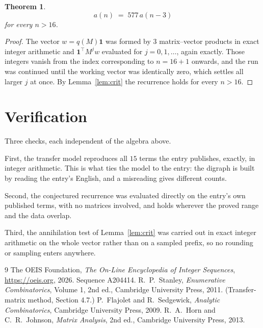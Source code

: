 \documentclass[11pt,a4paper]{article}
\theoremstyle{plain}
\newtheorem{theorem}{Theorem}
\theoremstyle{definition}
\begin{document}
\begin{theorem}
\[
a(n)\;=\;577\,a(n-3)
\]
for every $n>16$.
\end{theorem}

\begin{proof}
The vector $w=q(M)\mathbf{1}$ was formed by $3$ matrix--vector products in exact
integer arithmetic and $\mathbf{1}^{\!\top}M^{j}w$ evaluated for $j=0,1,\dots$, again
exactly. Those integers vanish from the index corresponding to $n=16+1$ onwards, and the
run was continued until the working vector was identically zero, which settles all larger $j$
at once. By Lemma~\ref{lem:crit} the recurrence holds for every $n>16$.
\end{proof}

\section{Verification}

Three checks, each independent of the algebra above.

First, the transfer model reproduces all $15$ terms the entry publishes, exactly, in
integer arithmetic. This is what ties the model to the entry: the digraph is built by reading
the entry's English, and a misreading gives different counts.

Second, the conjectured recurrence was evaluated directly on the entry's own published terms,
with no matrices involved, and holds wherever the proved range and the data overlap.

Third, the annihilation test of Lemma~\ref{lem:crit} was carried out in exact integer
arithmetic on the whole vector rather than on a sampled prefix, so no rounding or sampling
enters anywhere.

\begin{thebibliography}{9}
 The OEIS Foundation, \emph{The On-Line Encyclopedia of Integer
Sequences}, \url{https://oeis.org}, 2026. Sequence A204414.
 R.~P.~Stanley, \emph{Enumerative Combinatorics}, Volume 1, 2nd ed.,
Cambridge University Press, 2011. (Transfer-matrix method, Section 4.7.)
 P.~Flajolet and R.~Sedgewick, \emph{Analytic Combinatorics}, Cambridge
University Press, 2009.
 R.~A.~Horn and C.~R.~Johnson, \emph{Matrix Analysis}, 2nd ed., Cambridge
University Press, 2013.
\end{thebibliography}
\end{document}
